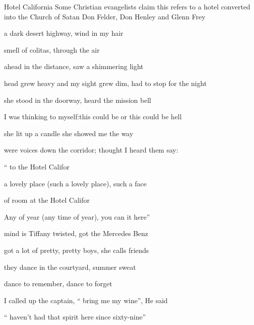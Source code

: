 \begin{SBSong}{Hotel California}  
  {Some Christian evangelists claim this refers to a hotel converted into the Church of Satan}
  {Don Felder, Don Henley and Glenn Frey}
  \SBDirection{}
  \begin{SBVerse}
     a dark desert highway,  wind in my hair

     smell of colitas,  through the air

     ahead in the distance,  saw a shimmering light

     head grew heavy and my sight grew dim,\WBLineBrk {} had to stop for the night

     she stood in the doorway,  heard the mission bell

     I was thinking to myself:\WBLineBrk this could be  or this could be hell

     she lit up a candle  she showed me the way

     were voices down the corridor;  thought I heard them say:
  \end{SBVerse}
  \begin{SBChorus}
    `` to the Hotel Califor

     a lovely place (such a lovely place), such a  face

     of room at the Hotel Califor

    Any  of year (any time of year), you can  it here''
  \end{SBChorus}
  \begin{SBVerse}
     mind is Tiffany twisted,  got the Mercedes Benz

     got a lot of pretty, pretty boys,  she calls friends

     they dance in the courtyard,  summer sweat

     dance to remember,  dance to forget

     I called up the captain, `` bring me my wine'', He said

    `` haven't had that spirit here since  sixty-nine''


\end{SBVerse}
\end{SBSong}
